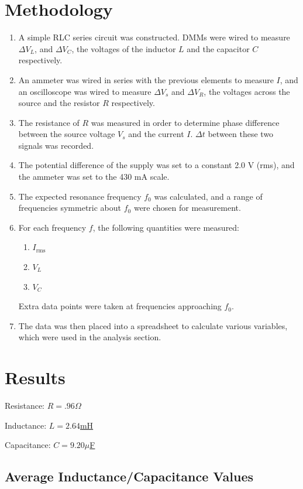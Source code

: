 \documentclass[twocolumn,english]{IEEEtran}
\theoremstyle{plain}
\theoremstyle{plain}
\begin{document}
\section{Methodology}
\begin{enumerate}
	\item A simple RLC series circuit was constructed. DMMs were wired to measure $\Delta V_L$, and $\Delta V_C$, the voltages of the inductor $L$ and the capacitor $C$ respectively.
	\item An ammeter was wired in series with the previous elements to measure $I$, and an oscilloscope was wired to measure $\Delta V_s$ and $\Delta V_R$, the voltages across the source and the resistor $R$ respectively.
	\item The resistance of $R$ was measured in order to determine phase difference between the source voltage $V_s$ and the current $I$. $\Delta t$ between these two signals was recorded.
	\item The potential difference of the supply was set to a constant 2.0 V (rms), and the ammeter was set to the 430 mA scale.
	\item The expected resonance frequency $f_0$ was calculated, and a range of frequencies symmetric about $f_0$ were chosen for measurement.
	\item For each frequency $f$, the following quantities were measured:
	\begin{enumerate}
		\item $I_{\text{rms}}$
		\item $V_L$
		\item $V_C$
	\end{enumerate}
	Extra data points were taken at frequencies approaching $f_0$.
	\item The data was then placed into a spreadsheet to calculate various variables, which were used in the analysis section.
\end{enumerate}

\noindent\hrulefill

\section{Results}
Resistance: \hfill\underline{$R = .96 \Omega$}

Inductance: \hfill\underline{$L = 2.64 $mH}

Capacitance: \hfill\underline{$C = 9.20 \mu$F }
\subsection{Average Inductance/Capacitance Values}
\end{document}
